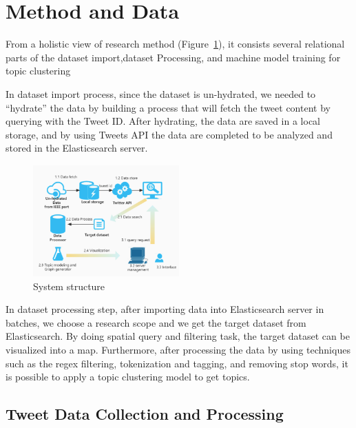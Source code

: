 \section{Method and Data} 
\label{sec:method}
From a holistic view of research method (Figure~\ref{fig:System structure}), it
consists several relational parts of the dataset import,dataset Processing, and machine model training for topic clustering

In dataset import process, since the dataset is un-hydrated, we needed
to “hydrate” the data by building a process that will fetch the tweet content
by querying with the Tweet ID. After hydrating, the data are saved in a local
storage, and by using Tweets API the data are completed to be analyzed and
stored in the Elasticsearch server. 
\begin{figure}[h]
\centering
\includegraphics[width=0.5\textwidth]{imgs/framework/framework.png}
\caption{System structure}
\label{fig:System structure}
\end{figure}
In dataset processing step, after importing data into Elasticsearch server in
batches, we choose a research scope and we get the target dataset from
Elasticsearch. By doing spatial query and filtering task, the target dataset
can be visualized into a map. Furthermore, after processing the data by using
techniques such as the regex filtering, tokenization and tagging, and
removing stop words, it is possible to apply a topic clustering model to get topics.


\subsection{Tweet Data Collection and Processing}
